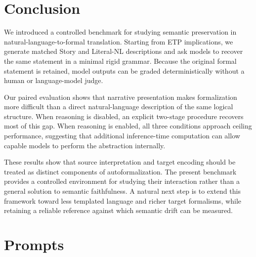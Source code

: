 \documentclass{article}
\begin{document}
\section{Conclusion}
We introduced a controlled benchmark for studying semantic preservation in
natural-language-to-formal translation. Starting from ETP implications, we
generate matched Story and Literal-NL descriptions and ask models to recover
the same statement in a minimal rigid grammar. Because the original formal
statement is retained, model outputs can be graded deterministically without
a human or language-model judge.

Our paired evaluation shows that narrative presentation makes formalization
more difficult than a direct natural-language description of the same logical
structure. When reasoning is disabled, an explicit two-stage procedure recovers
most of this gap. When reasoning is enabled, all three conditions approach
ceiling performance, suggesting that additional inference-time computation
can allow capable models to perform the abstraction internally.

These results show that source interpretation and target encoding should be
treated as distinct components of autoformalization. The present benchmark
provides a controlled environment for studying their interaction rather than
a general solution to semantic faithfulness. A natural next step is to extend
this framework toward less templated language and richer target formalisms,
while retaining a reliable reference against which semantic drift can be
measured.








\raggedbottom
\clearpage
\appendix

\section{Prompts}
\end{document}
